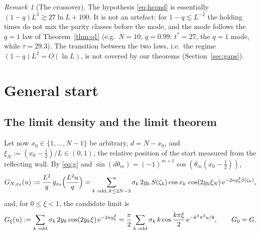 \documentclass[11pt,a4paper]{article}
\theoremstyle{definition}
\theoremstyle{remark}
\newtheorem{remark}[theorem]{Remark}
\newcommand{\ee}{\mathrm{e}}
\begin{document}
\begin{remark}[The crossover]\label{rem:crossover}
The hypothesis \eqref{eq:hcond} is essentially $(1-q)L^2\gtrsim27\ln L+100$. It is not an artefact: for
$1-q\lesssim L^{-2}$ the holding times do not mix the parity classes before the mode, and the mode follows the
$q=1$ law of Theorem~\ref{thm:q1} (e.g.\ $N=10$, $q=0.99$: $t^*=27$, the $q=1$ mode, while
$\tau=29.3$). The transition between the two laws, i.e.\ the regime $(1-q)L^2=O(\ln L)$, is not covered by our
theorems (Section~\ref{sec:gaps}).
\end{remark}

\section{General start}\label{sec:start}

\subsection{The limit density and the limit theorem}

Let now $x_0\in\{1,\dots,N-1\}$ be arbitrary, $d=N-x_0$, and $\xi_N:=(x_0-\frac12)/L\in(0,1)$, the relative position
of the start measured from the reflecting wall. By \eqref{eq:g} and $\sin(d\theta_m)=(-1)^{m+1}\cos(\theta_m(x_0-\frac12))$,
\begin{equation}\label{eq:GNxi}
  G_{N,x_0}(u):=\frac{L^2}q\,g_{x_0}\Bigl(\frac{L^2u}q\Bigr)=\sum_{k\ \mathrm{odd},\,k\le2N-3}\sigma_k\,2y_k\,S(\zeta_k)\cos x_k\,
      \cos(2y_k\xi_N)\,\ee^{-2uy_k^2\beta(\zeta_k)},
\end{equation}
and, for $0\le\xi<1$, the candidate limit is
\begin{equation}\label{eq:Gxi}
  G_\xi(u):=\sum_{k\ \rm odd}\sigma_k\,2y_k\cos(2y_k\xi)\,\ee^{-2uy_k^2}
           =\frac\pi2\sum_{k\ \rm odd}\sigma_k\,k\cos\frac{k\pi\xi}2\,\ee^{-k^2\pi^2u/8},\qquad G_0=G .
\end{equation}
\end{document}
